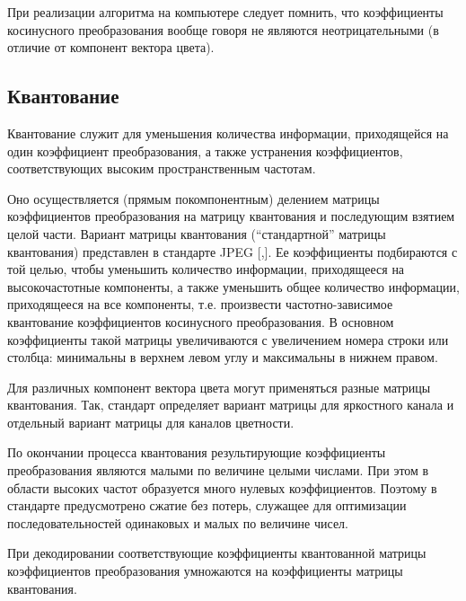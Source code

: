 \documentclass[12pt,a4paper]{article}
\begin{document}
            При реализации алгоритма на компьютере следует помнить, что коэффициенты косинусного преобразования вообще говоря не являются неотрицательными (в отличие от компонент вектора цвета).


        \subsection{Квантование}

            Квантование служит для уменьшения количества информации, приходящейся на один коэффициент преобразования, а также устранения коэффициентов, соответствующих высоким пространственным частотам.

            Оно осуществляется (прямым покомпонентным) делением матрицы коэффициентов преобразования на матрицу квантования и последующим взятием целой части. Вариант матрицы квантования (\enquote{стандартной} матрицы квантования) представлен в стандарте JPEG [\cite{ccitt_jpeg},\cite{mitchell_jpeg}]. Ее коэффициенты подбираются с той целью, чтобы уменьшить количество информации, приходящееся на высокочастотные компоненты, а также уменьшить общее количество информации, приходящееся на все компоненты, т.е. произвести частотно-зависимое квантование коэффициентов косинусного преобразования. В основном коэффициенты такой матрицы увеличиваются с увеличением номера строки или столбца: минимальны в верхнем левом углу и максимальны в нижнем правом.

            Для различных компонент вектора цвета могут применяться разные матрицы квантования. Так, стандарт определяет вариант матрицы для яркостного канала и отдельный вариант матрицы для каналов цветности.

            По окончании процесса квантования результирующие коэффициенты преобразования являются малыми по величине целыми числами. При этом в области высоких частот образуется много нулевых коэффициентов. Поэтому в стандарте предусмотрено сжатие без потерь, служащее для оптимизации последовательностей одинаковых и малых по величине чисел.

            При декодировании соответствующие коэффициенты квантованной матрицы коэффициентов преобразования умножаются на коэффициенты матрицы квантования.
\end{document}

